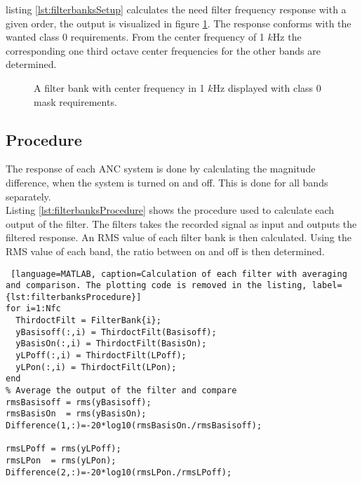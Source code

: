 listing \ref{lst:filterbanksSetup} calculates the need filter frequency response with a given order, the output is visualized in figure \ref{fig:1000KhzFilterClass0}. The response conforms with the wanted class 0 requirements. From the center frequency of 1 $k$Hz the corresponding one third octave center frequencies for the other bands are determined.

\begin{figure}[H]
	\centering
	
	\caption{A filter bank with center frequency in 1 $k$Hz displayed with class 0 mask requirements.}
	\label{fig:1000KhzFilterClass0}
\end{figure}

\subsection{Procedure}

The response of each ANC system is done by calculating the magnitude difference, when the system is turned on and off. This is done for all bands separately.  
\\
Listing \ref{lst:filterbanksProcedure} shows the procedure used to calculate each output of the filter. The filters takes the recorded signal as input and outputs the filtered response. An RMS value of each filter bank is then calculated. Using the RMS value of each band, the ratio between on and off is then determined. 

\begin{lstlisting} [language=MATLAB, caption=Calculation of each filter with averaging and comparison. The plotting code is removed in the listing, label={lst:filterbanksProcedure}]
for i=1:Nfc
  ThirdoctFilt = FilterBank{i};  
  yBasisoff(:,i) = ThirdoctFilt(Basisoff);
  yBasisOn(:,i) = ThirdoctFilt(BasisOn); 
  yLPoff(:,i) = ThirdoctFilt(LPoff);
  yLPon(:,i) = ThirdoctFilt(LPon);    
end
% Average the output of the filter and compare
rmsBasisoff = rms(yBasisoff);
rmsBasisOn  = rms(yBasisOn);
Difference(1,:)=-20*log10(rmsBasisOn./rmsBasisoff);
  
rmsLPoff = rms(yLPoff);
rmsLPon  = rms(yLPon);
Difference(2,:)=-20*log10(rmsLPon./rmsLPoff);
\end{lstlisting}

%
%
%
%


